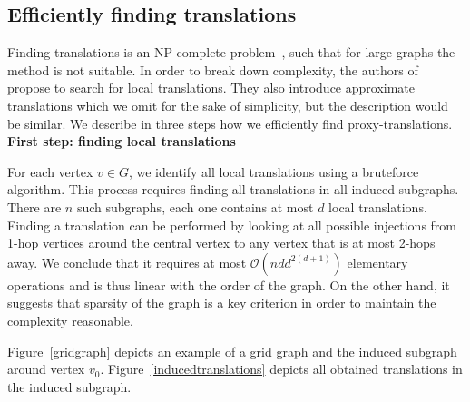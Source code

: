 \subsection{Efficiently finding translations}
Finding translations is an NP-complete problem~\cite{pasdeloup2017translations}, such that for large graphs the method is not suitable. 
In order to break down complexity, the authors of~\cite{pasdeloup2017convolutional} propose to search for local translations. They also introduce approximate translations which we omit for the sake of simplicity, but the description would be similar. We describe in three steps how we efficiently find proxy-translations.\\

\noindent\textbf{First step: finding local translations}

For each vertex $v \in G$, we identify all local translations using a bruteforce algorithm. This process requires finding all translations in all induced subgraphs. There are $n$ such subgraphs, each one contains at most $d$ local translations. Finding a translation can be performed by looking at all possible injections from 1-hop vertices around the central vertex to any vertex that is at most 2-hops away. We conclude that it requires at most $\mathcal{O}(nd d^{2(d+1)})$ elementary operations and is thus linear with the order of the graph. On the other hand, it suggests that sparsity of the graph is a key criterion in order to maintain the complexity reasonable.

Figure~\ref{gridgraph} depicts an example of a grid graph and the induced subgraph around vertex $v_0$. Figure~\ref{inducedtranslations} depicts all obtained translations in the induced subgraph.\\

